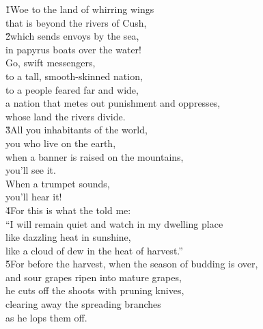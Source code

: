 \begin{poetry}
\poeml {}
\v{1}Woe to the land of whirring wings \\
\poemll    that is beyond the rivers of Cush, \\
\poeml \v{2}which sends envoys by the sea, \\
\poemll    in papyrus boats over the water! \\
\poeml Go, swift messengers, \\
\poemll    to a tall, smooth-skinned nation, \\
\poeml to a people feared far and wide, \\
\poemll    a nation that metes out punishment and oppresses, \\
\poemlll       whose land the rivers divide. \\
\poeml \v{3}All you inhabitants of the world, \\
\poemll    you who live on the earth, \\
\poeml when a banner is raised on the mountains, \\
\poemll    you'll see it. \\
\poeml When a trumpet sounds, \\
\poemll    you'll hear it! \\
\poeml \v{4}For this is what the  told me: \\
\poeml ``I will remain quiet and watch in my dwelling place \\
\poemll    like dazzling heat in sunshine, \\
\poemlll       like a cloud of dew in the heat of harvest.'' \\
\poeml \v{5}For before the harvest, when the season of budding is over, \\
\poemll    and sour grapes ripen into mature grapes, \\
\poeml he cuts off the shoots with pruning knives, \\
\poemll    clearing away the spreading branches \\
\poemlll       as he lops them off. \\

\end{poetry}

